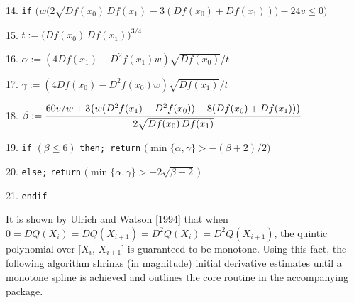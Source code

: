 {\item{14.} {\tt if} $\bigl( w\bigl(2\sqrt{Df(x_0)\,Df(x_1)} - 3(Df(x_0) +
  Df(x_1))\bigr) - 24v \leq 0 \bigr)$
\item{} 
\item{15.} $t := \bigl(Df(x_0)\, Df(x_1)\bigr)^{3/4}$
\item{16.} $\alpha := (4 Df(x_1) - D^2f(x_1)w) \sqrt{Df(x_0)} / t$
\item{17.} $\gamma := (4 Df(x_0) - D^2f(x_0)w) \sqrt{Df(x_1)} / t$
\item{18.} $\displaystyle \beta := {60v/w + 3\bigl(w(D^2f(x_1) -
  D^2f(x_0)) - 8(Df(x_0) + Df(x_1))\bigr) \over 2 \sqrt{Df(x_0)\,Df(x_1)}}$
\item{19.} {\tt if} $(\beta \leq 6)$ {\tt then; return}
$\bigl( \min\{\alpha,\gamma\} > - (\beta + 2) / 2 \bigr)$
\item{20.} {\tt else;} \hskip 18mm {\tt return}
$\bigl( \min\{\alpha,\gamma\} > -2 \sqrt{\beta - 2}\,\bigr)$
\item{21.} {\tt endif}
}
\vskip 5mm

It is shown by Ulrich and Watson [1994] that when $0 = DQ(X_i) =
DQ(X_{i+1}) = D^2Q(X_i) = D^2Q(X_{i+1})$, the quintic polynomial
over $[X_i$, $X_{i+1}]$ is guaranteed to be monotone. Using this fact, the
following algorithm shrinks (in magnitude) initial derivative estimates
until a monotone spline is achieved and outlines the core routine in the
accompanying package.

